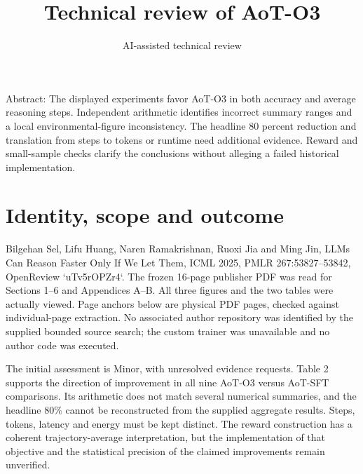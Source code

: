 \documentclass[10pt]{article}
\title{Technical review of AoT-O3}
\author{AI-assisted technical review}
\date{}
\begin{document}
\maketitle
Abstract: The displayed experiments favor AoT-O3 in both accuracy and average reasoning steps. Independent arithmetic identifies incorrect summary ranges and a local environmental-figure inconsistency. The headline 80 percent reduction and translation from steps to tokens or runtime need additional evidence. Reward and small-sample checks clarify the conclusions without alleging a failed historical implementation.\par
\section*{Identity, scope and outcome}
Bilgehan Sel, Lifu Huang, Naren Ramakrishnan, Ruoxi Jia and Ming Jin, LLMs Can Reason Faster Only If We Let Them, ICML 2025, PMLR 267:53827–53842, OpenReview `uTv5rOPZr4`. The frozen 16-page publisher PDF was read for Sections 1–6 and Appendices A–B. All three figures and the two tables were actually viewed. Page anchors below are physical PDF pages, checked against individual-page extraction. No associated author repository was identified by the supplied bounded source search; the custom trainer was unavailable and no author code was executed.\par
The initial assessment is Minor, with unresolved evidence requests. Table 2 supports the direction of improvement in all nine AoT-O3 versus AoT-SFT comparisons. Its arithmetic does not match several numerical summaries, and the headline \(80\%\) cannot be reconstructed from the supplied aggregate results. Steps, tokens, latency and energy must be kept distinct. The reward construction has a coherent trajectory-average interpretation, but the implementation of that objective and the statistical precision of the claimed improvements remain unverified.\par
\end{document}

